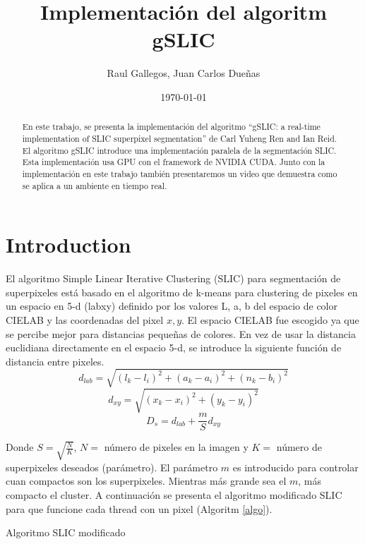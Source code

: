 \documentclass[11pt, oneside]{article}   	%
\title{Implementaci\'on del algoritm gSLIC}
\author{Raul Gallegos, Juan Carlos Due\~nas}
\date{\today}							%
\begin{document}
\maketitle
\begin{abstract}
En este trabajo, se presenta la implementaci\'on del algoritmo ``gSLIC: a real-time implementation of SLIC superpixel segmentation'' de Carl Yuheng Ren and Ian Reid\cite{YHRen_gSLIC}.
El algoritmo gSLIC introduce una implementaci\'on paralela de la segmentaci\'on SLIC. Esta implementaci\'on usa GPU con el framework de NVIDIA CUDA. Junto con la implementaci\'on en este trabajo tambi\'en presentaremos un video que demuestra como se aplica a un ambiente en tiempo real. 
\end{abstract}

\section{Introduction}
El algoritmo Simple Linear Iterative Clustering (SLIC) para segmentaci\'on de superpixeles est\'a basado en el algoritmo de k-means para clustering de pixeles en un espacio en 5-d (labxy) definido por los valores L, a, b del espacio de color CIELAB y las coordenadas del pixel $x,y$. El espacio CIELAB fue escogido ya que se percibe mejor para distancias pequeñas de colores. En vez de usar la distancia euclidiana directamente en el espacio 5-d, se introduce la siguiente función de distancia entre pixeles.
$$
d_{lab}=\sqrt{(l_k-l_i)^2+(a_k-a_i)^2+(n_k-b_i)^2}
$$
$$
d_{xy}=\sqrt{(x_k-x_i)^2+(y_k-y_i)^2}
$$
$$
D_s=d_{lab}+\frac{m}{S}d_{xy}
$$

Donde $S = \sqrt{\frac{N}{K}}$, $N=$ n\'umero de pixeles en la imagen y $K=$ n\'umero de superpixeles deseados (par\'ametro). El par\'ametro $m$ es introducido para controlar cuan compactos son los superpixeles. Mientras m\'as grande sea el $m$, m\'as compacto el cluster. A continuaci\'on se presenta el algoritmo modificado SLIC para que funcione cada thread con un pixel (Algoritm \ref{algo}).
\begin{algorithm}
\caption{Algoritmo SLIC modificado}
\label{algo}
\begin{algorithmic}[1]
\EndFor
{}
\EndFor
{}
\EndWhile
{}
\end{algorithmic}
\end{algorithm}




{}

\end{document}
